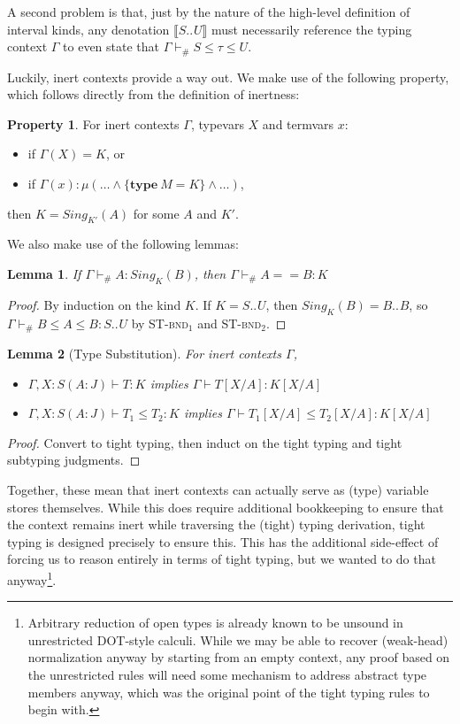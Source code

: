 \documentclass[a4paper, 10pt]{article}
\newcommand{\interval}[3][]{#2 .._{#1} #3}
\newcommand{\subst}[3]{#1[#2/#3]}
\newcommand{\objval}[3]{\{ \textbf{#1}\ #2 = #3 \}}
\newcommand{\KDenot}[1]{\llbracket #1 \rrbracket}
\newcommand{\Sing}[2]{Sing_{#2}(#1)}
\newtheorem{lemma}{Lemma}
\theoremstyle{definition}
\newtheorem{property}{Property}
\begin{document}
A second problem is that, just by the nature of the high-level definition of
interval kinds, any denotation $\KDenot{\interval{S}{U}}$ must necessarily
reference the typing context $\Gamma$ to even state that $\Gamma \vdash_\# S
\le \tau \le U$.

Luckily, inert contexts provide a way out. We make use of the following
property, which follows directly from the definition of inertness:
\begin{property}
  For inert contexts $\Gamma$, typevars $X$ and termvars $x$:
  \begin{itemize}
    \item if $\Gamma(X) = K$, or
    \item if $\Gamma(x) : \mu(\dots \land \objval{type}{M}{K} \land \dots)$,
  \end{itemize}
  then $K = \Sing{A}{K'}$ for some $A$ and $K'$.
\end{property}

We also make use of the following lemmas:
\begin{lemma}\label{lemma:sing-defn}
  If $\Gamma \vdash_\# A : \Sing{B}{K}$, then $\Gamma \vdash_\# A == B : K$
\end{lemma}
\begin{proof}
  By induction on the kind $K$. If $K = \interval{S}{U}$, then $\Sing{B}{K}=
  \interval{B}{B}$, so $\Gamma \vdash_\# B \le A \le B : \interval{S}{U}$ by
  \textsc{ST-bnd}$_1$ and \textsc{ST-bnd}$_2$.
\end{proof}
\begin{lemma}[Type Substitution]\label{lemma:typesubst}
  For inert contexts $\Gamma$,
  \begin{itemize}
    \item $\Gamma, X: S(A:J) \vdash T : K$ implies
      $\Gamma \vdash \subst{T}{X}{A} : \subst{K}{X}{A}$
    \item $\Gamma, X: S(A:J) \vdash T_1 \le T_2 : K$ implies
      $\Gamma \vdash \subst{T_1}{X}{A} \le \subst{T_2}{X}{A} : \subst{K}{X}{A}$
  \end{itemize}
\end{lemma}
\begin{proof}
  Convert to tight typing, then induct on the tight typing and tight subtyping
  judgments.
\end{proof}

Together, these mean that inert contexts can actually serve as (type) variable
stores themselves. While this does require additional bookkeeping to ensure
that the context remains inert while traversing the (tight) typing derivation,
tight typing is designed precisely to ensure this. This has the additional
side-effect of forcing us to reason entirely in terms of tight typing, but we
wanted to do that anyway\footnote{Arbitrary reduction of open types is already
known to be unsound in unrestricted DOT-style calculi. While we may be able to
recover (weak-head) normalization anyway by starting from an empty context, any
proof based on the unrestricted rules will need some mechanism to address
abstract type members anyway, which was the original point of the tight typing
rules to begin with.}.
\end{document}
